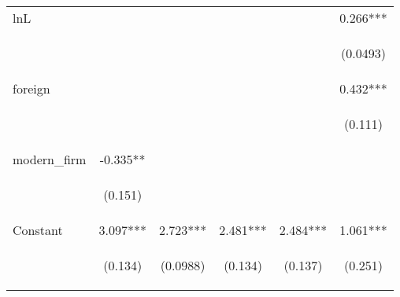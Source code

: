 \begin{center}
\begin{tabular}{lccccc}
lnL &  &  &  &  & 0.266*** \\
\vspace{4pt} & \begin{footnotesize}\end{footnotesize} & \begin{footnotesize}\end{footnotesize} & \begin{footnotesize}\end{footnotesize} & \begin{footnotesize}\end{footnotesize} & \begin{footnotesize}(0.0493)\end{footnotesize} \\
foreign &  &  &  &  & 0.432*** \\
\vspace{4pt} & \begin{footnotesize}\end{footnotesize} & \begin{footnotesize}\end{footnotesize} & \begin{footnotesize}\end{footnotesize} & \begin{footnotesize}\end{footnotesize} & \begin{footnotesize}(0.111)\end{footnotesize} \\
modern\_firm & -0.335** &  &  &  &  \\
\vspace{4pt} & \begin{footnotesize}(0.151)\end{footnotesize} & \begin{footnotesize}\end{footnotesize} & \begin{footnotesize}\end{footnotesize} & \begin{footnotesize}\end{footnotesize} & \begin{footnotesize}\end{footnotesize} \\
Constant & 3.097*** & 2.723*** & 2.481*** & 2.484*** & 1.061*** \\
 & \begin{footnotesize}(0.134)\end{footnotesize} & \begin{footnotesize}(0.0988)\end{footnotesize} & \begin{footnotesize}(0.134)\end{footnotesize} & \begin{footnotesize}(0.137)\end{footnotesize} & \begin{footnotesize}(0.251)\end{footnotesize} \\

\end{tabular}
\end{center}
